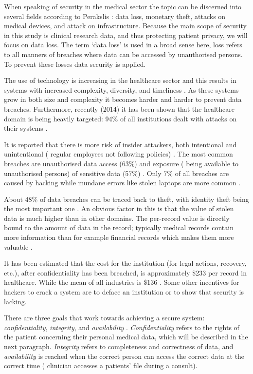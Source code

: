 When speaking of security in the medical sector the topic can be discerned into several fields according to Perakslis \cite{s2Perakslis2014}: data loss, monetary theft, attacks on medical devices, and attack on infrastructure.
Because the main scope of security in this study is clinical research data, and thus protecting patient privacy, we will focus on data loss.
The term `data loss' is used in a broad sense here, loss refers to all manners of breaches where data can be accessed by unauthorised persons.
To prevent these losses data security is applied.

The use of technology is increasing in the healthcare sector and this results in systems with increased complexity, diversity, and timeliness \cite{s13Patil2014}.
As these systems grow in both size and complexity it becomes harder and harder to prevent data breaches.
Furthermore, recently (2014) it has been shown that the healthcare domain is being heavily targeted: 94\% of all institutions dealt with attacks on their systems \cite{s2Perakslis2014}.

It is reported that there is more risk of insider attackers, both intentional and unintentional (\eg{} regular employees not following policies) \cite{s1Zamosky2014}.
The most common breaches are unauthorised data access (63\%) and exposure (\ie{} being available to unauthorised persons) of sensitive data (57\%) \cite{s18Kum2014}.
Only 7\% of all breaches are caused by hacking while mundane errors like stolen laptops are more common \cite{s1Zamosky2014}.

About 48\% of data breaches can be traced back to theft, with identity theft being the most important one \cite{s1Zamosky2014}.
An obvious factor in this is that the value of stolen data is much higher than in other domains.
The per-record value is directly bound to the amount of data in the record; typically medical records contain more information than for example financial records which makes them more valuable \cite{s1Zamosky2014}.

It has been estimated that the cost for the institution (for legal actions, recovery, etc.), after confidentiality has been breached, is approximately \$233 per record in healthcare.
While the mean of all industries is \$136 \cite{s2Perakslis2014}.
Some other incentives for hackers to crack a system are to deface an institution or to show that security is lacking.

There are three goals that work towards achieving a secure system: \emph{confidentiality}, \emph{integrity}, and \emph{availability} \cite{s8FernandezAleman2013}.
\emph{Confidentiality} refers to the rights of the patient concerning their personal medical data, which will be described in the next paragraph.
\emph{Integrity} refers to completeness and correctness of data, and \emph{availability} is reached when the correct person can access the correct data at the correct time (\eg{} clinician accesses a patients' file during a consult).

